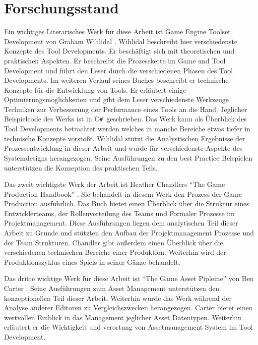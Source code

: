 \documentclass[pagesize, paper=a4, fontsize=12pt, titlepage=true, headings=small, headnosepline, abstractoff, liststotoc, nochapterprefix, plainheadsepline, twoside]{scrreprt}
\newcommand{\CSS}{C\texttt{\# }}
\begin{document}
\section{Forschungsstand}
Ein wichtiges Literarisches Werk für diese Arbeit ist Game Engine Toolset Development von Graham Wihlidal \parencite{Wihlidal2006}.  Wihlidal beschreibt hier verschiedenste Konzepte des Tool Developments. Er beschäftigt sich mit theoretischen und praktischen Aspekten. Er beschreibt die Prozesskette im Game und Tool Development und führt den Leser durch die verschiedenen Phasen des Tool Developments. Im weiteren Verlauf seines Buches beschreibt er technische Konzepte für die Entwicklung von Tools. Er erläutert einige Optimierungsmöglichkeiten und gibt dem Leser verschiedenste Werkzeuge Techniken zur Verbesserung der Performance eines Tools an die Hand. Jeglicher Beispielcode des Werks ist in \CSS geschrieben. Das Werk kann als Überblick des Tool Developments betrachtet werden welches in manche Bereiche etwas tiefer in technische Konzepte vorstößt. Wihlidal stützt die Analystischen Ergebnisse der Prozessentwicklung in dieser Arbeit und wurde für verschiedenste Aspekte des Systemdesigns herangezogen. Seine Ausführungen zu den best Practice Beispielen unterstützen die Konzeption des praktischen Teils.

Das zweit wichtigste Werk der Arbeit ist Heather Chandlers “The Game Production Handbook” \parencite{Chandler2006}. Sie behandelt in diesem Werk den Prozess der Game Production ausführlich. Das Buch bietet einen Überblick über die Struktur eines Entwicklerteams, der Rollenverteilung des Teams und Formaler Prozesse im Projektmanagement. Diese Ausführungen liegen dem analytischen Teil dieser Arbeit zu Grunde und stützten den Aufbau der Projektmanagement Prozesse und der Team Strukturen. Chandler gibt außerdem einen Überblick über die verschiedenen technischen Bereiche einer Produktion. Weiterhin wird der Produktionszyklus eines Spiels in seiner Gänze behandelt.

Das dritte wichtige Werk für diese Arbeit ist “The Game Asset Pipleine” von Ben Carter \parencite{Carter2004}. Seine Ausführungen zum Asset Management unterstützen den konzeptionellen Teil dieser Arbeit. Weiterhin wurde das Werk während der Analyse anderer Editoren zu Vergleichszwecken herangezogen. Carter bietet einen wertvollen Einblick in das Management jeglicher Asset Datentypen. Weiterhin erläutert er die Wichtigkeit und verortung von Assetmanagement System im Tool Development.
\end{document}
